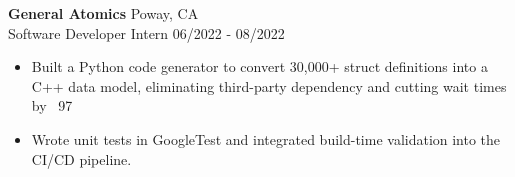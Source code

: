 
\textbf{General Atomics} \hfill Poway, CA \\
\textnormal{Software Developer Intern} \hfill 06/2022 - 08/2022
\begin{itemize}[leftmargin=*, nosep]
  \item Built a Python code generator to convert 30,000+ struct definitions into a C++ data model, eliminating third-party dependency and cutting wait times by ~97%
  \item Wrote unit tests in GoogleTest and integrated build-time validation into the CI/CD pipeline.
\end{itemize}
